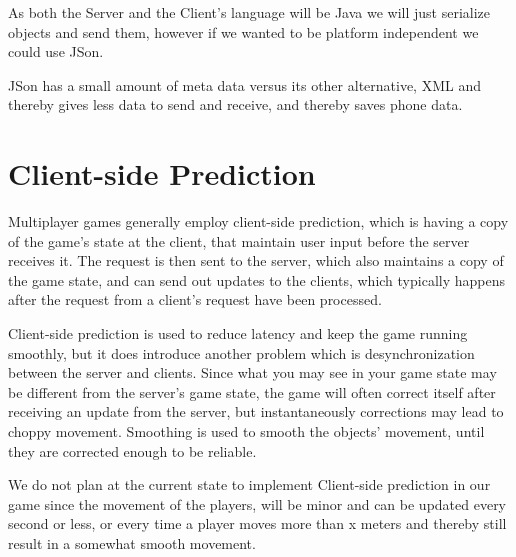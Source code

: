 As both the Server and the Client's language will be Java we will just serialize objects and send them, however if we wanted to be platform independent we could use JSon.

JSon has a small amount of meta data versus its other alternative, XML\cite{XMLvsJSON} and thereby gives less data to send and receive, and thereby saves phone data.


\section{Client-side Prediction}
\label{cha:MMO}

Multiplayer games generally employ client-side prediction, which is having a copy of the game's state at the client, that maintain user input before the server receives it. The request is then sent to the server, which also maintains a copy of the game state, and can send out updates to the clients, which typically happens after the request from a client's request have been processed.

Client-side prediction is used to reduce latency and keep the game running smoothly, but it does introduce another problem which is desynchronization between the server and clients. Since what you may see in your game state may be different from the server's game state, the game will often correct itself after receiving an update from the server, but instantaneously corrections may lead to choppy movement. Smoothing is used to smooth the objects' movement, until they are corrected enough to be reliable\cite{Clientsideprediction}.

We do not plan at the current state to implement Client-side prediction in our game since the movement of the players, will be minor and can be updated every second or less, or every time a player moves more than x meters and thereby still result in a somewhat smooth movement.